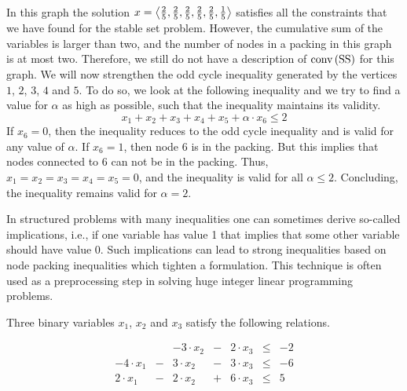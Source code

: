 {\begin{example}
\paragraph{}
In this graph the solution $x=\left\langle \frac{2}{5},\frac{2}{5},\frac{2}{5},\frac{2}{5},\frac{2}{5},\frac{1}{5} \right\rangle$ satisfies all the constraints that we have found for the stable set problem. However, the cumulative sum of the variables is larger than two, and the number of nodes in a packing in this graph is at most two. Therefore, we still do not have a description of $\mbox{conv}\left( \mbox{SS} \right)$ for this graph. We will now strengthen the odd cycle inequality generated by the vertices $1$, $2$, $3$, $4$ and $5$. To do so, we look at the following inequality and we try to find a value for $\alpha$ as high as possible, such that the inequality maintains its validity.
\begin{equation}
x_1+x_2+x_3+x_4+x_5+\alpha\cdot x_6\leq 2
\end{equation}
If $x_6=0$, then the inequality reduces to the odd cycle inequality and is valid for any value of $\alpha$. If $x_6=1$, then node $6$ is in the packing. But this implies that nodes connected to $6$ can not be in the packing. Thus, $x_1=x_2=x_3=x_4=x_5=0$, and the inequality is valid for all $\alpha\leq 2$. Concluding, the inequality remains valid for $\alpha=2$.
\end{example}
\begin{application}
In structured problems with many inequalities one can sometimes derive so-called implications, i.e., if one variable has value 1 that implies that some other variable should have value 0. Such implications can lead to strong inequalities based on node packing inequalities which tighten a formulation. This technique is often used as a preprocessing step in solving huge integer linear programming problems.
\end{application}
\begin{example}
Three binary variables $x_1$, $x_2$ and $x_3$ satisfy the following relations.

\begin{equation}
\begin{array}{rcrcrcr}
&&-3\cdot x_2&-&2\cdot x_3&\leq&-2\\
-4\cdot x_1&-&3\cdot x_2&-&3\cdot x_3&\leq&-6\\
2\cdot x_1&-&2\cdot x_2&+&6\cdot x_3&\leq&5
\end{array}
\end{equation}


\end{example}}
